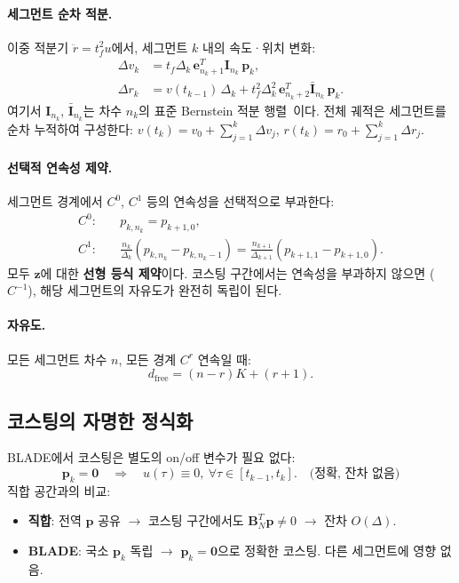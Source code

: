 \documentclass[11pt]{article}
\begin{document}
\paragraph{세그먼트 순차 적분.}
이중 적분기 $\ddot{r} = t_f^2 u$에서,
세그먼트 $k$ 내의 속도·위치 변화:
\begin{align}
  \Delta v_k &= t_f \Delta_k\, \mathbf{e}_{n_k+1}^T \mathbf{I}_{n_k}\, \mathbf{p}_k,
  \label{eq:dv_k} \\
  \Delta r_k &= v(t_{k-1})\, \Delta_k
  + t_f^2 \Delta_k^2\, \mathbf{e}_{n_k+2}^T \bar{\mathbf{I}}_{n_k}\, \mathbf{p}_k.
  \label{eq:dr_k}
\end{align}
여기서 $\mathbf{I}_{n_k}$, $\bar{\mathbf{I}}_{n_k}$는 차수 $n_k$의
표준 Bernstein 적분 행렬~\cite{report004}이다.
전체 궤적은 세그먼트를 순차 누적하여 구성한다:
$v(t_k) = v_0 + \sum_{j=1}^{k} \Delta v_j$,
$r(t_k) = r_0 + \sum_{j=1}^{k} \Delta r_j$.

\paragraph{선택적 연속성 제약.}
세그먼트 경계에서 $C^0$, $C^1$ 등의 연속성을 선택적으로 부과한다:
\begin{align}
  C^0\!: &\quad p_{k,n_k} = p_{k+1,0}, \label{eq:C0} \\
  C^1\!: &\quad \frac{n_k}{\Delta_k}(p_{k,n_k} - p_{k,n_k-1})
  = \frac{n_{k+1}}{\Delta_{k+1}}(p_{k+1,1} - p_{k+1,0}). \label{eq:C1}
\end{align}
모두 $\mathbf{z}$에 대한 \textbf{선형 등식 제약}이다.
코스팅 구간에서는 연속성을 부과하지 않으면 ($C^{-1}$),
해당 세그먼트의 자유도가 완전히 독립이 된다.

\paragraph{자유도.}
모든 세그먼트 차수 $n$, 모든 경계 $C^r$ 연속일 때:
\begin{equation}\label{eq:dof}
  d_{\mathrm{free}} = (n - r)K + (r + 1).
\end{equation}


\subsection{코스팅의 자명한 정식화}
\label{sec:blade_coast}

BLADE에서 코스팅은 별도의 on/off 변수가 필요 없다:
\begin{equation}\label{eq:blade_coast}
  \boxed{
  \mathbf{p}_k = \mathbf{0}
  \quad\Longrightarrow\quad
  u(\tau) \equiv 0,\ \forall \tau \in [t_{k-1}, t_k].
  \quad\text{(정확, 잔차 없음)}
  }
\end{equation}
직합 공간과의 비교:
\begin{itemize}
\item \textbf{직합}: 전역 $\mathbf{p}$ 공유 $\to$ 코스팅 구간에서도
  $\mathbf{B}_N^T \mathbf{p} \ne 0$ $\to$ 잔차 $O(\Delta)$.
\item \textbf{BLADE}: 국소 $\mathbf{p}_k$ 독립 $\to$
  $\mathbf{p}_k = \mathbf{0}$으로 정확한 코스팅. 다른 세그먼트에 영향 없음.
\end{itemize}
\end{document}
